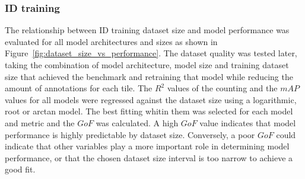 \documentclass[12pt,a4paper,oneside]{report}
\begin{document}
\subsubsection{ID training}

The relationship between ID training dataset size and model performance was evaluated 
for all model architectures and sizes as shown in Figure~\ref{fig:dataset_size_vs_performance}. 
The dataset quality was tested later, taking the combination of model architecture, model size and
training dataset size that achieved the benchmark and retraining that model while reducing the amount of
annotations for each tile. 
The $R^2$ values of the counting and the $mAP$ values for all models were regressed 
against the dataset size using a logarithmic, root or arctan model. The best fitting
whitin them was selected for each model and metric and the $GoF$ was calculated.
A high $GoF$ value indicates that model performance is highly predictable by dataset size. 
Conversely, a poor $GoF$ could indicate that other variables play a more important 
role in determining model performance, or that the chosen dataset size interval is 
too narrow to achieve a good fit.
\end{document}

